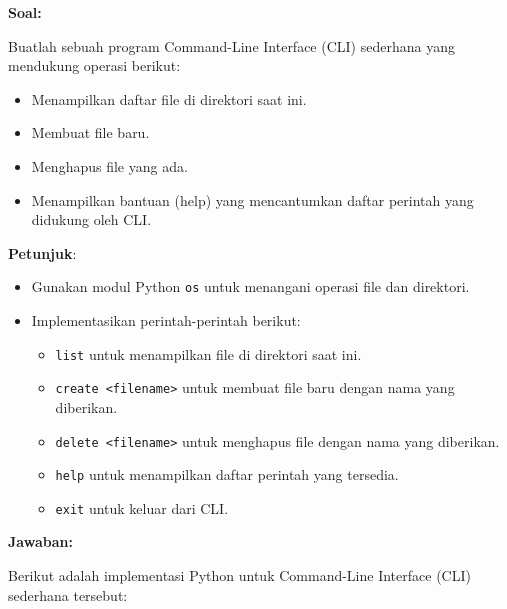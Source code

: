 \documentclass[12pt]{article}
\begin{document}
\textbf{Soal:}

Buatlah sebuah program Command-Line Interface (CLI) sederhana yang mendukung operasi berikut:
\begin{itemize}
    \item Menampilkan daftar file di direktori saat ini.
    \item Membuat file baru.
    \item Menghapus file yang ada.
    \item Menampilkan bantuan (help) yang mencantumkan daftar perintah yang didukung oleh CLI.
\end{itemize}

\textbf{Petunjuk}:
\begin{itemize}
    \item Gunakan modul Python \texttt{os} untuk menangani operasi file dan direktori.
    \item Implementasikan perintah-perintah berikut:
        \begin{itemize}
            \item \texttt{list} untuk menampilkan file di direktori saat ini.
            \item \texttt{create <filename>} untuk membuat file baru dengan nama yang diberikan.
            \item \texttt{delete <filename>} untuk menghapus file dengan nama yang diberikan.
            \item \texttt{help} untuk menampilkan daftar perintah yang tersedia.
            \item \texttt{exit} untuk keluar dari CLI.
        \end{itemize}
\end{itemize}

\textbf{Jawaban:}

Berikut adalah implementasi Python untuk Command-Line Interface (CLI) sederhana tersebut:
\end{document}
